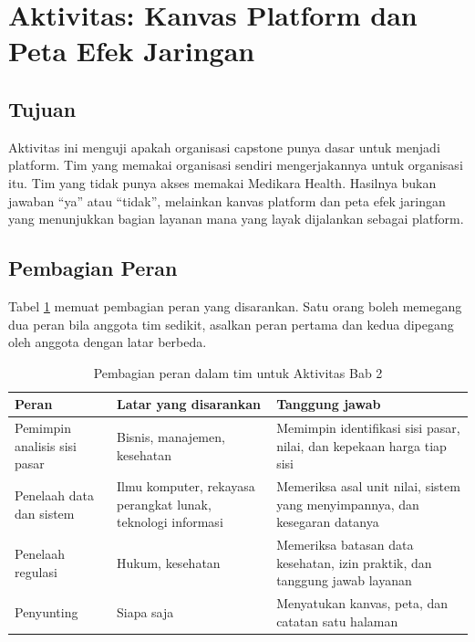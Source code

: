 \section{Aktivitas: Kanvas Platform dan Peta Efek Jaringan}

\subsection*{Tujuan}

Aktivitas ini menguji apakah organisasi capstone punya dasar untuk menjadi
platform. Tim yang memakai organisasi sendiri mengerjakannya untuk organisasi
itu. Tim yang tidak punya akses memakai Medikara Health. Hasilnya bukan jawaban
``ya'' atau ``tidak'', melainkan kanvas platform dan peta efek jaringan yang
menunjukkan bagian layanan mana yang layak dijalankan sebagai platform.

\subsection*{Pembagian Peran}

Tabel \ref{tab:ch02-peran} memuat pembagian peran yang disarankan. Satu orang
boleh memegang dua peran bila anggota tim sedikit, asalkan peran pertama dan
kedua dipegang oleh anggota dengan latar berbeda.

\begin{table}[!htb]
  \centering
  \caption{Pembagian peran dalam tim untuk Aktivitas Bab 2}
  \label{tab:ch02-peran}
  \begin{tabularx}{\textwidth}{lXX}
    \hline
    \textbf{Peran} & \textbf{Latar yang disarankan} & \textbf{Tanggung jawab} \\
    \hline
    Pemimpin analisis sisi pasar & Bisnis, manajemen, kesehatan & Memimpin identifikasi sisi pasar, nilai, dan kepekaan harga tiap sisi \\
    \hline
    Penelaah data dan sistem & Ilmu komputer, rekayasa perangkat lunak, teknologi informasi & Memeriksa asal unit nilai, sistem yang menyimpannya, dan kesegaran datanya \\
    \hline
    Penelaah regulasi & Hukum, kesehatan & Memeriksa batasan data kesehatan, izin praktik, dan tanggung jawab layanan \\
    \hline
    Penyunting & Siapa saja & Menyatukan kanvas, peta, dan catatan satu halaman \\
    \hline
  \end{tabularx}
\end{table}

